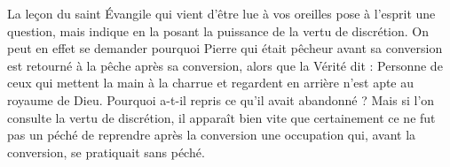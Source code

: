  La leçon du saint Évangile qui vient d'être lue à vos oreilles pose à l’esprit une question, mais indique en la posant la puissance de la vertu de discrétion. On peut en effet se demander pourquoi Pierre qui était pêcheur avant sa conversion est retourné à la pêche après sa conversion, alors que la Vérité dit : Personne de ceux qui mettent la main à la charrue et regardent en arrière n'est apte au royaume de Dieu. Pourquoi a-t-il repris ce qu’il avait abandonné ? Mais si l’on consulte la vertu de discrétion, il apparaît bien vite que certainement ce ne fut pas un péché de reprendre après la conversion une occupation qui, avant la conversion, se pratiquait sans péché.